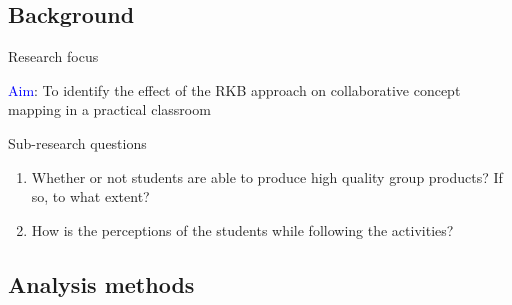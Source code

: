 \subsection{Background}
\begin{frame}{Research focus}

\textcolor{blue}{Aim}:
    To identify the effect of the RKB approach on collaborative concept mapping in a practical classroom


\begin{block}{Sub-research questions}
    \begin{enumerate}
        \item <1-> Whether or not students are able to produce high quality group products? If so, to what extent?
        \item <2-> How is the perceptions of the students while following the activities?
\end{enumerate}
\end{block}

\end{frame}

\subsection{Analysis methods}

